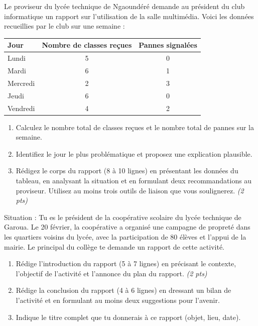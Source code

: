 \documentclass[11pt]{article}
\begin{document}
\begin{exercice}
Le proviseur du lycée technique de Ngaoundéré demande au président du club informatique un rapport sur l'utilisation de la salle multimédia. Voici les données recueillies par le club sur une semaine :

\begin{center}
\begin{tabular}{|l|c|c|}
\hline
\textbf{Jour} & \textbf{Nombre de classes reçues} & \textbf{Pannes signalées} \\
\hline
Lundi & 5 & 0 \\
\hline
Mardi & 6 & 1 \\
\hline
Mercredi & 2 & 3 \\
\hline
Jeudi & 6 & 0 \\
\hline
Vendredi & 4 & 2 \\
\hline
\end{tabular}
\end{center}

\begin{enumerate}
\item Calculez le nombre total de classes reçues et le nombre total de pannes sur la semaine.
\item Identifiez le jour le plus problématique et proposez une explication plausible.
\item Rédigez le corps du rapport (8 à 10 lignes) en présentant les données du tableau, en analysant la situation et en formulant deux recommandations au proviseur. Utilisez au moins trois outils de liaison que vous soulignerez. \textit{(2 pts)}
\end{enumerate}
\end{exercice}

\begin{exercice}
Situation : Tu es le président de la coopérative scolaire du lycée technique de Garoua. Le 20 février, la coopérative a organisé une campagne de propreté dans les quartiers voisins du lycée, avec la participation de 80 élèves et l'appui de la mairie. Le principal du collège te demande un rapport de cette activité.

\begin{enumerate}
\item Rédige l'introduction du rapport (5 à 7 lignes) en précisant le contexte, l'objectif de l'activité et l'annonce du plan du rapport. \textit{(2 pts)}
\item Rédige la conclusion du rapport (4 à 6 lignes) en dressant un bilan de l'activité et en formulant au moins deux suggestions pour l'avenir.
\item Indique le titre complet que tu donnerais à ce rapport (objet, lieu, date).
\end{enumerate}
\end{exercice}
\end{document}
